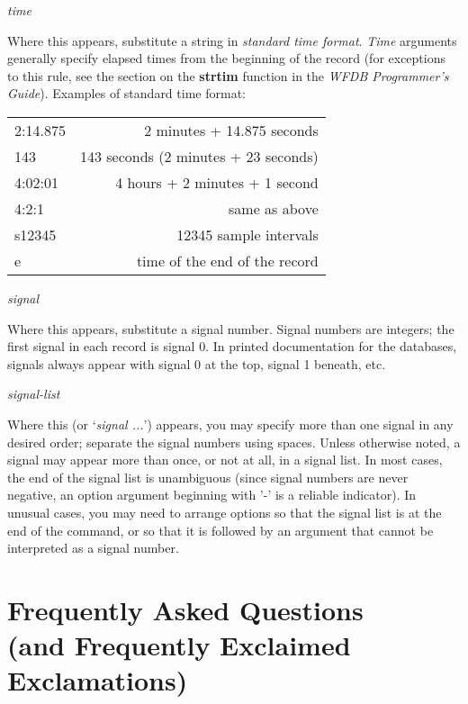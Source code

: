 \documentclass[twoside]{book}
\begin{document}
\begin{description}
\item{\textit{time}}

Where this appears, substitute a string in \textit{standard time format}.
\textit{Time} arguments generally specify elapsed times from the beginning
of the record (for exceptions to this rule, see the section on the
\textbf{strtim} function in the \textit{WFDB Programmer's Guide}).  Examples
of standard time format:

\begin{center}
\begin{tabular}{lr}
2:14.875 & 2 minutes + 14.875 seconds \\
143 & 143 seconds (2 minutes + 23 seconds) \\
4:02:01 & 4 hours + 2 minutes + 1 second \\
4:2:1 & same as above \\
s12345 & 12345 sample intervals \\
e & time of the end of the record \\
\end{tabular}
\end{center}

\item{\textit{signal}}

Where this appears, substitute a signal number.  Signal numbers are integers;
the first signal in each record is signal 0.  In printed documentation for
the databases, signals always appear with signal 0 at the top, signal 1
beneath, etc.

\item{\textit{signal-list}}

Where this (or `\textit{signal ...}') appears, you may specify more than one
signal in any desired order;  separate the signal numbers using spaces.
Unless otherwise noted, a signal may appear more than once, or not at all,
in a signal list. In most cases, the end of the signal list is unambiguous
(since signal numbers are never negative, an option argument beginning
with '-' is a reliable indicator). In unusual cases, you may need to arrange
options so that the signal list is at the end of the command, or so that it
is followed by an argument that cannot be interpreted as a signal number. 
\end{description}

\chapter*{Frequently Asked Questions\\(and Frequently Exclaimed Exclamations)}
\end{document}
